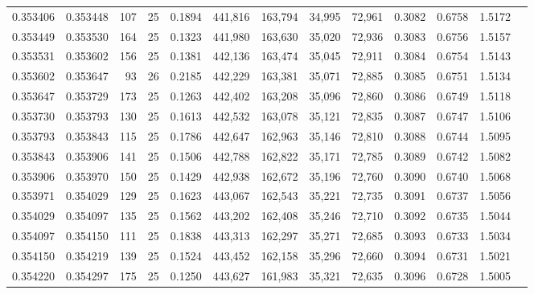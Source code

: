 \begin{tabular}{rrrrrrrrrrrrr}
0.353406 & 0.353448 &   107 &  25 &                                     0.1894 & 441,816 & 163,794 &  34,995 &  72,961 & 0.3082 & 0.6758 & 1.5172 \\
0.353449 & 0.353530 &   164 &  25 &                                     0.1323 & 441,980 & 163,630 &  35,020 &  72,936 & 0.3083 & 0.6756 & 1.5157 \\
0.353531 & 0.353602 &   156 &  25 &                                     0.1381 & 442,136 & 163,474 &  35,045 &  72,911 & 0.3084 & 0.6754 & 1.5143 \\
0.353602 & 0.353647 &    93 &  26 &                                     0.2185 & 442,229 & 163,381 &  35,071 &  72,885 & 0.3085 & 0.6751 & 1.5134 \\
0.353647 & 0.353729 &   173 &  25 &                                     0.1263 & 442,402 & 163,208 &  35,096 &  72,860 & 0.3086 & 0.6749 & 1.5118 \\
0.353730 & 0.353793 &   130 &  25 &                                     0.1613 & 442,532 & 163,078 &  35,121 &  72,835 & 0.3087 & 0.6747 & 1.5106 \\
0.353793 & 0.353843 &   115 &  25 &                                     0.1786 & 442,647 & 162,963 &  35,146 &  72,810 & 0.3088 & 0.6744 & 1.5095 \\
0.353843 & 0.353906 &   141 &  25 &                                     0.1506 & 442,788 & 162,822 &  35,171 &  72,785 & 0.3089 & 0.6742 & 1.5082 \\
0.353906 & 0.353970 &   150 &  25 &                                     0.1429 & 442,938 & 162,672 &  35,196 &  72,760 & 0.3090 & 0.6740 & 1.5068 \\
0.353971 & 0.354029 &   129 &  25 &                                     0.1623 & 443,067 & 162,543 &  35,221 &  72,735 & 0.3091 & 0.6737 & 1.5056 \\
0.354029 & 0.354097 &   135 &  25 &                                     0.1562 & 443,202 & 162,408 &  35,246 &  72,710 & 0.3092 & 0.6735 & 1.5044 \\
0.354097 & 0.354150 &   111 &  25 &                                     0.1838 & 443,313 & 162,297 &  35,271 &  72,685 & 0.3093 & 0.6733 & 1.5034 \\
0.354150 & 0.354219 &   139 &  25 &                                     0.1524 & 443,452 & 162,158 &  35,296 &  72,660 & 0.3094 & 0.6731 & 1.5021 \\
0.354220 & 0.354297 &   175 &  25 &                                     0.1250 & 443,627 & 161,983 &  35,321 &  72,635 & 0.3096 & 0.6728 & 1.5005 \\

\end{tabular}
